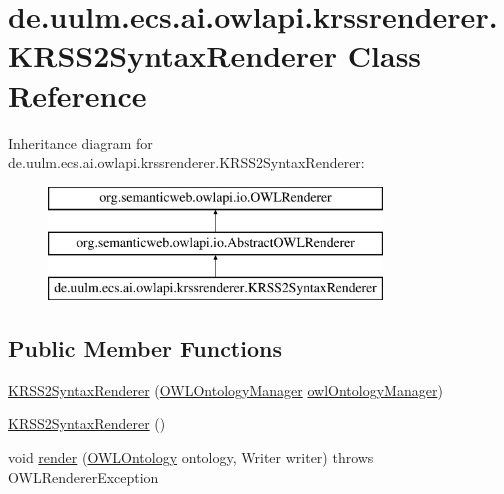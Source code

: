 \hypertarget{classde_1_1uulm_1_1ecs_1_1ai_1_1owlapi_1_1krssrenderer_1_1_k_r_s_s2_syntax_renderer}{\section{de.\-uulm.\-ecs.\-ai.\-owlapi.\-krssrenderer.\-K\-R\-S\-S2\-Syntax\-Renderer Class Reference}
\label{classde_1_1uulm_1_1ecs_1_1ai_1_1owlapi_1_1krssrenderer_1_1_k_r_s_s2_syntax_renderer}
}
Inheritance diagram for de.\-uulm.\-ecs.\-ai.\-owlapi.\-krssrenderer.\-K\-R\-S\-S2\-Syntax\-Renderer\-:\begin{figure}[H]
\begin{center}
\leavevmode
\includegraphics[height=3.000000cm]{classde_1_1uulm_1_1ecs_1_1ai_1_1owlapi_1_1krssrenderer_1_1_k_r_s_s2_syntax_renderer}
\end{center}
\end{figure}
\subsection*{Public Member Functions}
\begin{DoxyCompactItemize}
\item 
\hyperlink{classde_1_1uulm_1_1ecs_1_1ai_1_1owlapi_1_1krssrenderer_1_1_k_r_s_s2_syntax_renderer_aca142d094cfedc69e7cd143899fe8bc9}{K\-R\-S\-S2\-Syntax\-Renderer} (\hyperlink{interfaceorg_1_1semanticweb_1_1owlapi_1_1model_1_1_o_w_l_ontology_manager}{O\-W\-L\-Ontology\-Manager} \hyperlink{classorg_1_1semanticweb_1_1owlapi_1_1io_1_1_abstract_o_w_l_renderer_abb9888586f19a7a923cba542d99f1556}{owl\-Ontology\-Manager})
\item 
\hyperlink{classde_1_1uulm_1_1ecs_1_1ai_1_1owlapi_1_1krssrenderer_1_1_k_r_s_s2_syntax_renderer_ab9e15c38820dbffeb2317027de6a802f}{K\-R\-S\-S2\-Syntax\-Renderer} ()
\item 
void \hyperlink{classde_1_1uulm_1_1ecs_1_1ai_1_1owlapi_1_1krssrenderer_1_1_k_r_s_s2_syntax_renderer_a7605ed3a8de4b28b0a57dad345a5b3cb}{render} (\hyperlink{interfaceorg_1_1semanticweb_1_1owlapi_1_1model_1_1_o_w_l_ontology}{O\-W\-L\-Ontology} ontology, Writer writer)  throws O\-W\-L\-Renderer\-Exception 
\end{DoxyCompactItemize}
